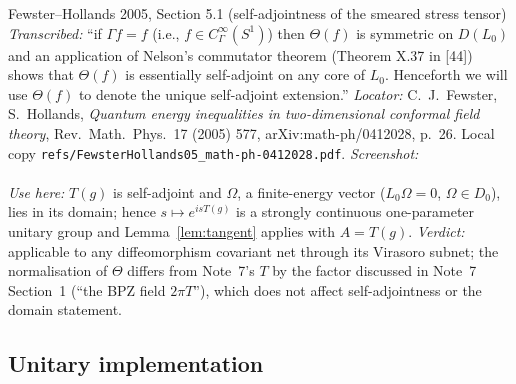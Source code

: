 \documentclass[11pt]{article}
\newcommand{\Om}{\Omega}
\begin{document}
\begin{citedbox}{Fewster--Hollands 2005, Section 5.1 (self-adjointness of the smeared stress tensor)}
\emph{Transcribed:} ``if $\Gamma f=f$ (i.e., $f\in C^\infty_\Gamma(S^1)$) then $\Theta(f)$ is symmetric on $D(L_0)$
and an application of Nelson's commutator theorem (Theorem X.37 in [44]) shows that $\Theta(f)$ is essentially
self-adjoint on any core of $L_0$.  Henceforth we will use $\Theta(f)$ to denote the unique self-adjoint extension.''
\emph{Locator:} C.~J.~Fewster, S.~Hollands, \emph{Quantum energy inequalities in two-dimensional conformal field
theory}, Rev.\ Math.\ Phys.\ 17 (2005) 577, arXiv:math-ph/0412028, p.~26.  Local copy
\texttt{refs/FewsterHollands05\_math-ph-0412028.pdf}.
\emph{Screenshot:}\\
\\
\emph{Use here:} $T(g)$ is self-adjoint and $\Om$, a finite-energy vector ($L_0\Om=0$, $\Om\in D_0$), lies in its
domain; hence $s\mapsto e^{isT(g)}$ is a strongly continuous one-parameter unitary group and Lemma~\ref{lem:tangent}
applies with $A=T(g)$.  \emph{Verdict:} applicable to any diffeomorphism covariant net through its Virasoro subnet;
the normalisation of $\Theta$ differs from Note~7's $T$ by the factor discussed in Note~7 Section~1
(``the BPZ field $2\pi T$''), which does not affect self-adjointness or the domain statement.
\end{citedbox}

\subsection{Unitary implementation}
\end{document}
